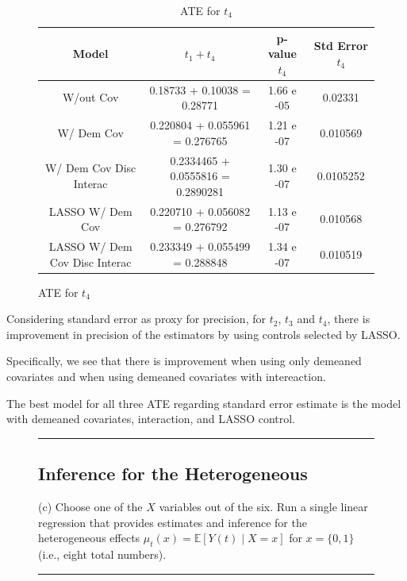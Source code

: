 \documentclass{article}
\newenvironment{colorparagraph}[1]{\par\color{#1}}{\par}
\begin{document}
\begin{figure}[H]
\begin{table}[H]
  \centering
  \small
  \begin{tabular}{|cccc|}
    \hline
    Model & $t_1 + t_4$ & p-value $t_4$ & Std Error $t_4$ \\
    \hline
    W/out Cov                & 0.18733 + 0.10038 = 0.28771 & 1.66 e -05          & 0.02331 \\
    W/ Dem Cov               & 0.220804 + 0.055961 = 0.276765 & 1.21 e -07       & 0.010569 \\ 
    W/ Dem Cov Disc Interac  & 0.2334465 + 0.0555816 = 0.2890281 & 1.30 e -07    & 0.0105252 \\   
    LASSO W/ Dem Cov               & 0.220710 + 0.056082 = 0.276792 & 1.13 e -07 & 0.010568 \\       
    LASSO W/ Dem Cov Disc Interac  & 0.233349 + 0.055499 = 0.288848 & 1.34 e -07 & 0.010519 \\       
    \hline
  \end{tabular}
  \caption{ATE for $t_4$}
\end{table}
\end{figure}

Considering standard error as proxy for precision, for $t_2$, $t_3$ and $t_4$, there is improvement in precision of the estimators by using controls selected by LASSO.

Specifically, we see that there is improvement when using only demeaned covariates and when using demeaned covariates with intereaction.

The best model for all three ATE regarding standard error estimate is the model with demeaned covariates, interaction, and LASSO control.

\begin{figure}[H]
\begin{colorparagraph}{questioncolor}
\label{q3c}
\rule{\textwidth}{0.5pt}
\subsection{Inference for the Heterogeneous}
(c) Choose one of the \( X \) variables out of the six. Run a single linear regression that provides estimates and inference for the heterogeneous effects \( \mu_t(x) = \mathbb{E}[Y(t) \mid X = x] \) for \( x = \{0, 1\} \) (i.e., eight total numbers).

\rule{\textwidth}{0.5pt}
\end{colorparagraph}
\end{figure}
\end{document}

